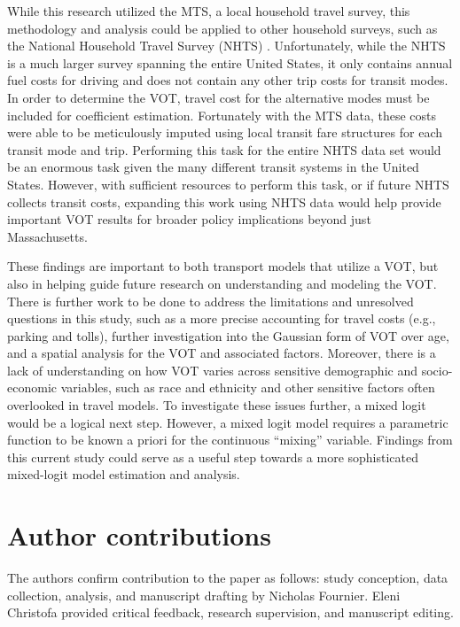 \documentclass[numbered]{trbunofficial}\usepackage[]{graphicx}\usepackage[]{color}
\begin{document}
While this research utilized the MTS, a local household travel survey, this methodology and analysis could be applied to other household surveys, such as the National Household Travel Survey (NHTS) \citep{NHTS2017}. Unfortunately, while the NHTS is a much larger survey spanning the entire United States, it only contains annual fuel costs for driving and does not contain any other trip costs for transit modes. In order to determine the VOT, travel cost for the alternative modes must be included for coefficient estimation. Fortunately with the MTS data, these costs were able to be meticulously imputed using local transit fare structures for each transit mode and trip. Performing this task for the entire NHTS data set would be an enormous task given the many different transit systems in the United States. However, with sufficient resources to perform this task, or if future NHTS collects transit costs, expanding this work using NHTS data would help provide important VOT results for broader policy implications beyond just Massachusetts.

These findings are important to both transport models that utilize a VOT, but also in helping guide future research on understanding and modeling the VOT. There is further work to be done to address the limitations and unresolved questions in this study, such as a more precise accounting for travel costs (e.g., parking and tolls), further investigation into the Gaussian form of VOT over age, and a spatial analysis for the VOT and associated factors. Moreover, there is a lack of understanding on how VOT varies across sensitive demographic and socio-economic variables, such as race and ethnicity and other sensitive factors often overlooked in travel models. To investigate these issues further, a mixed logit would be a logical next step. However, a mixed logit model requires a parametric function to be known a priori for the continuous ``mixing'' variable. Findings from this current study could serve as a useful step towards a more sophisticated mixed-logit model estimation and analysis. 

\section{Author contributions}
The authors confirm contribution to the paper as follows: study conception, data collection, analysis, and manuscript drafting by Nicholas Fournier. Eleni Christofa provided critical feedback, research supervision, and manuscript editing.
\end{document}
